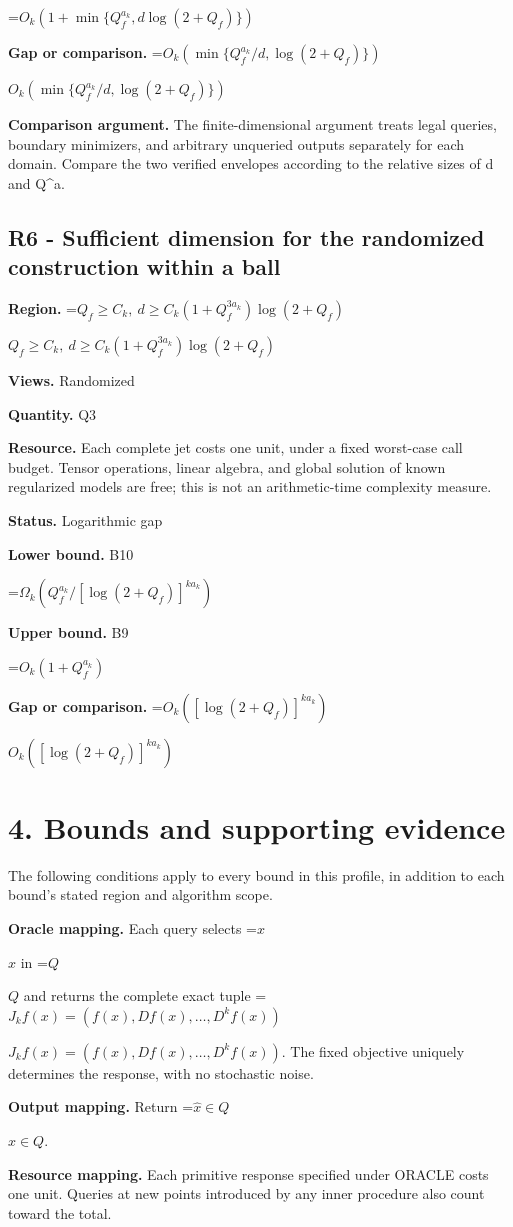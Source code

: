 \documentclass[10pt,a4paper]{article}
\newcommand{\AtlasMath}[1]{\par\begingroup\centering\setbox0=\hbox{$\displaystyle #1$}\ifdim\wd0>1.4\linewidth\typeout{ATLAS WIDE FORMULA: \the\wd0}\fi\ifdim\wd0>\linewidth\resizebox{\linewidth}{!}{\box0}\else\box0\fi\par\endgroup}
\newcommand{\AtlasInlineMath}[1]{\begingroup\setbox0=\hbox{$#1$}\ifdim\wd0>.4\linewidth\endgroup\AtlasMath{#1}\else\endgroup$#1$\fi}
\begin{document}
\AtlasMath{O_k(1+\min\{Q_f^{a_k},d\log(2+Q_f)\})}
\textbf{Gap or comparison.} \AtlasInlineMath{O_k(\min\{Q_f^{a_k}/d,\log(2+Q_f)\})}

\textbf{Comparison argument.} The finite-dimensional argument treats legal queries, boundary minimizers, and arbitrary unqueried outputs separately for each domain. Compare the two verified envelopes according to the relative sizes of d and Q\textasciicircum{}a.

\subsection{R6 - Sufficient dimension for the randomized construction within a ball}
\textbf{Region.} \AtlasInlineMath{Q_f\ge C_k,\ d\ge C_k(1+Q_f^{3a_k})\log(2+Q_f)}

\textbf{Views.} Randomized

\textbf{Quantity.} Q3

\textbf{Resource.} Each complete jet costs one unit, under a fixed worst-case call budget. Tensor operations, linear algebra, and global solution of known regularized models are free; this is not an arithmetic-time complexity measure.

\textbf{Status.} Logarithmic gap

\textbf{Lower bound.} B10

\AtlasMath{\Omega_k(Q_f^{a_k}/[\log(2+Q_f)]^{k a_k})}
\textbf{Upper bound.} B9

\AtlasMath{O_k(1+Q_f^{a_k})}
\textbf{Gap or comparison.} \AtlasInlineMath{O_k([\log(2+Q_f)]^{k a_k})}

\section{4. Bounds and supporting evidence}
The following conditions apply to every bound in this profile, in addition to each bound's stated region and algorithm scope.

\textbf{Oracle mapping.} Each query selects \AtlasInlineMath{x} in \AtlasInlineMath{Q} and returns the complete exact tuple \AtlasInlineMath{J_{k}f(x)=(f(x),Df(x),\ldots,D^{k}f(x))}. The fixed objective uniquely determines the response, with no stochastic noise.

\textbf{Output mapping.} Return \AtlasInlineMath{\widehat{x}\in Q}.

\textbf{Resource mapping.} Each primitive response specified under ORACLE costs one unit. Queries at new points introduced by any inner procedure also count toward the total.
\end{document}

